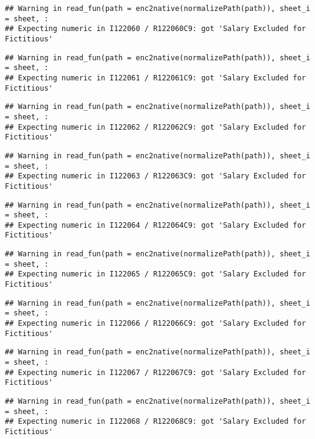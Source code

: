 \documentclass[
]{article}
\begin{document}
\begin{verbatim}
## Warning in read_fun(path = enc2native(normalizePath(path)), sheet_i = sheet, :
## Expecting numeric in I122060 / R122060C9: got 'Salary Excluded for Fictitious'
\end{verbatim}

\begin{verbatim}
## Warning in read_fun(path = enc2native(normalizePath(path)), sheet_i = sheet, :
## Expecting numeric in I122061 / R122061C9: got 'Salary Excluded for Fictitious'
\end{verbatim}

\begin{verbatim}
## Warning in read_fun(path = enc2native(normalizePath(path)), sheet_i = sheet, :
## Expecting numeric in I122062 / R122062C9: got 'Salary Excluded for Fictitious'
\end{verbatim}

\begin{verbatim}
## Warning in read_fun(path = enc2native(normalizePath(path)), sheet_i = sheet, :
## Expecting numeric in I122063 / R122063C9: got 'Salary Excluded for Fictitious'
\end{verbatim}

\begin{verbatim}
## Warning in read_fun(path = enc2native(normalizePath(path)), sheet_i = sheet, :
## Expecting numeric in I122064 / R122064C9: got 'Salary Excluded for Fictitious'
\end{verbatim}

\begin{verbatim}
## Warning in read_fun(path = enc2native(normalizePath(path)), sheet_i = sheet, :
## Expecting numeric in I122065 / R122065C9: got 'Salary Excluded for Fictitious'
\end{verbatim}

\begin{verbatim}
## Warning in read_fun(path = enc2native(normalizePath(path)), sheet_i = sheet, :
## Expecting numeric in I122066 / R122066C9: got 'Salary Excluded for Fictitious'
\end{verbatim}

\begin{verbatim}
## Warning in read_fun(path = enc2native(normalizePath(path)), sheet_i = sheet, :
## Expecting numeric in I122067 / R122067C9: got 'Salary Excluded for Fictitious'
\end{verbatim}

\begin{verbatim}
## Warning in read_fun(path = enc2native(normalizePath(path)), sheet_i = sheet, :
## Expecting numeric in I122068 / R122068C9: got 'Salary Excluded for Fictitious'
\end{verbatim}
\end{document}
